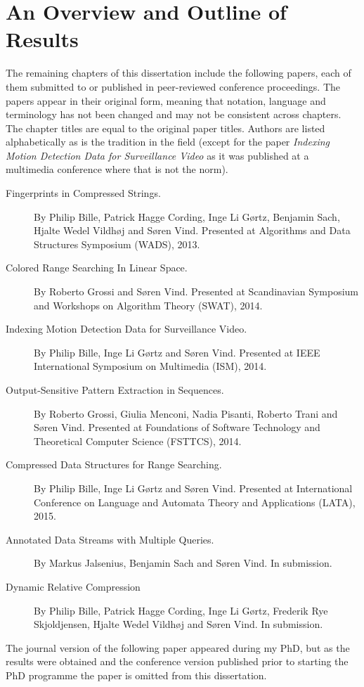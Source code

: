 \section{An Overview and Outline of Results}
The remaining chapters of this dissertation include the following papers, each of them submitted to or published in peer-reviewed conference proceedings. The papers appear in their original form, meaning that notation, language and terminology has not been changed and may not be consistent across chapters. The chapter titles are equal to the original paper titles. Authors are listed alphabetically as is the tradition in the field (except for the paper \emph{Indexing Motion Detection Data for Surveillance Video} as it was published at a multimedia conference where that is not the norm).

\begin{description}
    \item[Fingerprints in Compressed Strings.] By Philip Bille, Patrick Hagge Cording, Inge Li Gørtz, Benjamin Sach, Hjalte Wedel Vildhøj and Søren Vind. Presented at Algorithms and Data Structures Symposium (WADS), 2013.
    \item[Colored Range Searching In Linear Space.] By Roberto Grossi and Søren Vind. Presented at Scandinavian Symposium and Workshops on Algorithm Theory (SWAT), 2014.
    \item[Indexing Motion Detection Data for Surveillance Video.] By Philip Bille, Inge Li Gørtz and Søren Vind. Presented at IEEE International Symposium on Multimedia (ISM), 2014.
    \item[Output-Sensitive Pattern Extraction in Sequences.] By Roberto Grossi, Giulia Menconi, Nadia Pisanti, Roberto Trani and Søren Vind. Presented at Foundations of Software Technology and Theoretical Computer Science (FSTTCS), 2014.
    \item[Compressed Data Structures for Range Searching.] By Philip Bille, Inge Li Gørtz and Søren Vind. Presented at International Conference on Language and Automata Theory and Applications (LATA), 2015.
    \item[Annotated Data Streams with Multiple Queries.] By Markus Jalsenius, Benjamin Sach and Søren Vind. In submission.
    \item[Dynamic Relative Compression] By Philip Bille, Patrick Hagge Cording, Inge Li Gørtz, Frederik Rye Skjoldjensen, Hjalte Wedel Vildhøj and Søren Vind. In submission.
\end{description}

The journal version of the following paper appeared during my PhD, but as the results were obtained and the conference version published prior to starting the PhD programme the paper is omitted from this dissertation.


